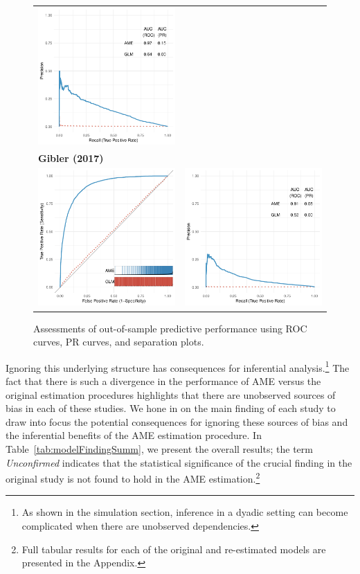 \begin{figure}
\begin{tabular}{cc}
		\includegraphics[width=.4\textwidth]{graphics/weeks_pr_outSample.pdf} \\
		\multicolumn{2}{l}{\textbf{\tiny{Gibler (2017)}}} \\
		\includegraphics[width=.4\textwidth]{graphics/gibler_roc_outSample.pdf} &
		\includegraphics[width=.4\textwidth]{graphics/gibler_pr_outSample.pdf} \\
	\end{tabular}
	\caption{Assessments of out-of-sample predictive performance using ROC curves, PR curves, and separation plots.}
	\label{fig:perf}
\end{figure}

Ignoring this underlying structure has consequences for inferential analysis.\footnote{As shown in the simulation section, inference in a dyadic setting can become complicated when there are unobserved dependencies.} The fact that there is such a divergence in the performance of AME versus the original estimation procedures highlights that there are unobserved sources of bias in each of these studies. We hone in on the main finding of each study to draw into focus the potential consequences for ignoring these sources of bias and the inferential benefits of the AME estimation procedure.  In Table~\ref{tab:modelFindingSumm}, we present the overall results; the term \textit{Unconfirmed} indicates that the statistical significance of the crucial finding in the original study is not found to hold in the AME estimation.\footnote{Full tabular results for each of the original and re-estimated models are presented in the Appendix.}


